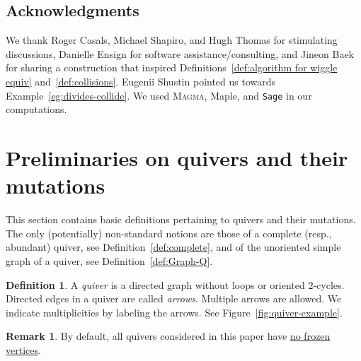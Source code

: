 \documentclass[11pt, letterpaper]{amsart}
\theoremstyle{definition}
\newtheorem{remark}[theorem]{Remark}
\newtheorem{definition}[theorem]{Definition}
\numberwithin{equation}{section}
\begin{document}


\subsection*{Acknowledgments}

We thank Roger Casals, Michael Shapiro, and Hugh Thomas for stimulating discussions, Danielle Ensign for software assistance/consulting,
and Jineon Baek for sharing a construction that inspired Definitions~\ref{def:algorithm for wiggle equiv} and~\ref{def:collisions}. 
\hbox{Eugenii} Shustin pointed us towards Example~\ref{eg:divides-collide}.
We used \textsc{Magma}, \textsf{Maple}, and \texttt{Sage} in our computations. 



\newpage

\section{Preliminaries on quivers and their mutations}
\label{sec:defs}

This section contains basic definitions pertaining to quivers and their mutations. 
The only (potentially) non-standard notions are those of a complete (resp., abundant) quiver, 
see Definition~\ref{def:complete}, and of the unoriented simple graph of a quiver, see Definition~\ref{def:Graph-Q}.

\begin{definition} 
A \emph{quiver} is a directed graph without loops or oriented $2$-cycles. Directed edges in a quiver are called \emph{arrows}. Multiple arrows are allowed. 
We indicate multiplicities by labeling the arrows. See Figure~\ref{fig:quiver-example}. 
\end{definition}

\begin{remark} 
By default, all quivers considered in this paper have \underline{no frozen vertices}. 
\end{remark}
\end{document}
